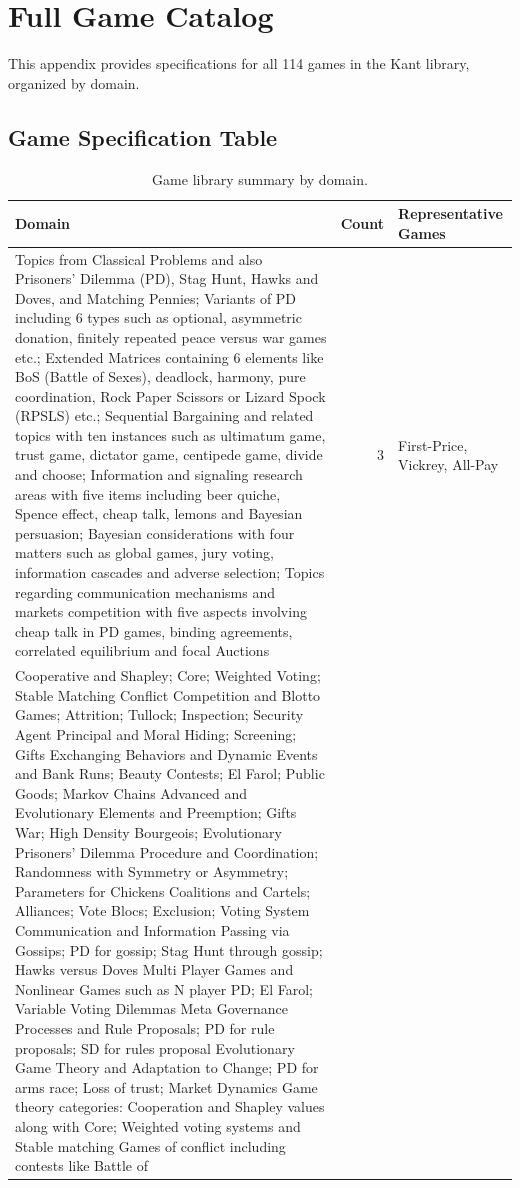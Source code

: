 
\section{Full Game Catalog}
\label{app:catalog}

This appendix provides specifications for all 114 games in the Kant library,
organized by domain.

\subsection{Game Specification Table}

\begin{table}[h]
\centering
\caption{Game library summary by domain.}
\label{tab:full-catalog}
\small
\begin{tabular}{@{}lrp{6cm}@{}}
\toprule
\textbf{Domain} & \textbf{Count} & \textbf{Representative Games} \\
\midrule
Topics from Classical Problems and also Prisoners' Dilemma (PD), Stag Hunt, Hawks and Doves, and Matching Pennies; Variants of PD including 6 types such as optional, asymmetric donation, finitely repeated peace versus war games etc.; Extended Matrices containing 6 elements like BoS (Battle of Sexes), deadlock, harmony, pure coordination, Rock Paper Scissors or Lizard Spock (RPSLS) etc.; Sequential Bargaining and related topics with ten instances such as ultimatum game, trust game, dictator game, centipede game, divide and choose; Information and signaling research areas with five items including beer quiche, Spence effect, cheap talk, lemons and Bayesian persuasion; Bayesian considerations with four matters such as global games, jury voting, information cascades and adverse selection; Topics regarding communication mechanisms and markets competition with five aspects involving cheap talk in PD games, binding agreements, correlated equilibrium and focal
Auctions & 3 & First-Price, Vickrey, All-Pay \\
Cooperative and Shapley; Core; Weighted Voting; Stable Matching Conflict Competition and Blotto Games; Attrition; Tullock; Inspection; Security Agent Principal and Moral Hiding; Screening; Gifts Exchanging Behaviors and Dynamic Events and Bank Runs; Beauty Contests; El Farol; Public Goods; Markov Chains Advanced and Evolutionary Elements and Preemption; Gifts War; High Density Bourgeois; Evolutionary Prisoners' Dilemma Procedure and Coordination; Randomness with Symmetry or Asymmetry; Parameters for Chickens Coalitions and Cartels; Alliances; Vote Blocs; Exclusion; Voting System Communication and Information Passing via Gossips; PD for gossip; Stag Hunt through gossip; Hawks versus Doves Multi Player Games and Nonlinear Games such as N player PD; El Farol; Variable Voting Dilemmas Meta Governance Processes and Rule Proposals; PD for rule proposals; SD for rules proposal Evolutionary Game Theory and Adaptation to Change; PD for arms race; Loss of trust; Market Dynamics Game theory categories: Cooperation and Shapley values along with Core; Weighted voting systems and Stable matching Games of conflict including contests like Battle of

\end{tabular}
\end{table}
